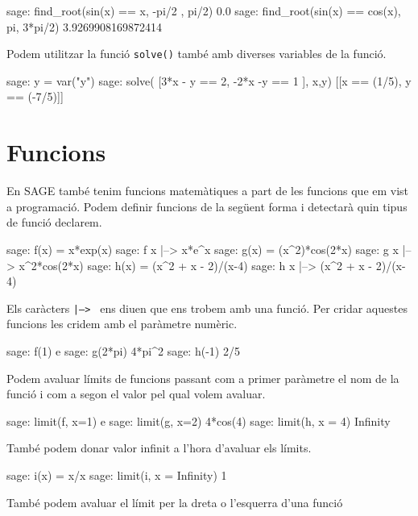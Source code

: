 \begin{blockcode}
sage: find_root(sin(x) == x, -pi/2 , pi/2)
0.0
sage: find_root(sin(x) == cos(x), pi, 3*pi/2)
3.9269908169872414
\end{blockcode}

Podem utilitzar la funció {\tt solve()} també amb diverses variables de la funció.

\begin{blockcode}
sage: y = var("y")
sage: solve( [3*x - y == 2, -2*x -y == 1 ], x,y)
[[x == (1/5), y == (-7/5)]]
\end{blockcode}


\section{Funcions}

En SAGE també tenim funcions matemàtiques a part de les funcions que em vist a programació. Podem definir funcions de la següent forma i detectarà quin tipus de funció declarem.


\begin{blockcode}
sage: f(x) = x*exp(x)
sage: f
x |--> x*e^x
sage: g(x) = (x^2)*cos(2*x)
sage: g
x |--> x^2*cos(2*x)
sage: h(x) = (x^2 + x - 2)/(x-4)
sage: h
x |--> (x^2 + x - 2)/(x-4)
\end{blockcode}

Els caràcters {\tt |--> } ens diuen que ens trobem amb una funció. Per cridar aquestes funcions les cridem amb el paràmetre numèric.

\begin{blockcode}
sage: f(1)
e
sage: g(2*pi)
4*pi^2
sage: h(-1)
2/5
\end{blockcode}



Podem avaluar límits de funcions passant com a primer paràmetre el nom de la funció i com a segon el valor pel qual volem avaluar.



\begin{blockcode}
sage: limit(f, x=1)
e
sage: limit(g, x=2)
4*cos(4)
sage: limit(h, x = 4)
Infinity
\end{blockcode}

També podem donar valor infinit a l'hora d'avaluar els límits.

\begin{blockcode}
sage: i(x) = x/x
sage: limit(i, x = Infinity)
1
\end{blockcode}

També podem avaluar el límit per la dreta o l'esquerra d'una funció


